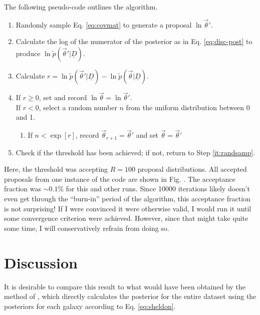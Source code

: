 \documentclass[12pt, onecolumn]{emulateapj}
\newcommand{\textul}{\underline}
\begin{document}
The following pseudo-code outlines the algorithm.

\begin{enumerate}
\item \label{it:randsamp} Randomly sample Eq. \ref{eq:covmat} to generate a proposal $\ln\vec{\theta}'$.
\item Calculate the log of the numerator of the posterior as in Eq. \ref{eq:disc-post} to produce $\ln\tilde{p}(\vec{\theta}'|\textul{D})$.
\item Calculate $r=\ln\tilde{p}(\vec{\theta}'|\textul{D})-\ln\tilde{p}(\vec{\theta}|\textul{D})$.
\item If $r\geq0$, set and record $\ln\vec{\theta}=\ln\vec{\theta}'$.\\
If $r<0$, select a random number $n$ from the uniform distribution between 0 and 1.
\begin{enumerate}
\item If $n<\exp[r]$, record $\vec{\theta}_{r+1}=\vec{\theta}'$ and set $\vec{\theta}=\vec{\theta}'$
\end{enumerate}
\item Check if the threshold has been achieved; if not, return to Step \ref{it:randsamp}.
\end{enumerate}

Here, the threshold was accepting $R=100$ proposal distributions.  All accepted proposals from one instance of the code are shown in Fig. %
.  The acceptance fraction was $\sim0.1\%$ for this and other runs.  Since 10000 iterations likely doesn't even get through the ``burn-in'' period of the algorithm, this acceptance fraction is not surprising!  If I were convinced it were otherwise valid, I would run it until some convergence criterion were achieved.  However, since that might take quite some time, I will conservatively refrain from doing so.


\section{Discussion}

It is desirable to compare this result to what would have been obtained by the method of \citet{she11}, which directly calculates the posterior for the entire dataset using the posteriors for each galaxy according to Eq. \ref{eq:sheldon}.
\end{document}
